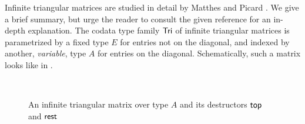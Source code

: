 \documentclass[a4paper,USenglish]{lipics}
\begin{document}
\begin{ex}\label{ex_tri}
Infinite triangular matrices are studied in detail by Matthes and Picard \cite{DBLP:conf/types/MatthesP11}.
 We give a brief summary, but urge the reader to consult the given reference 
 for an in-depth explanation. 
 The codata type family $\mathsf{Tri}$ of infinite triangular matrices 
 is parametrized by a fixed type $E$ for entries not on the diagonal, 
 and indexed by another, \emph{variable}, type $A$ for entries on 
 the diagonal. 
 Schematically, such a matrix looks like in .
 \begin{figure}[hbt]
 \centering
 \\[-2ex]
  \caption{An infinite triangular matrix over type $A$ and its destructors $\mathsf{top}$ and $\mathsf{rest}$}\label{fig_tri}
 \end{figure}


\end{ex}
\end{document}
